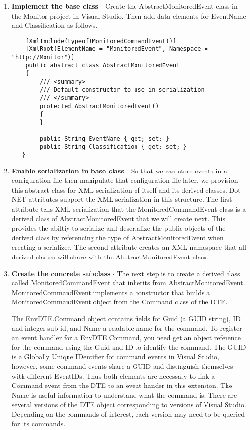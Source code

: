 \begin{enumerate}
\item {\bf Implement the base class} - 
Create the AbstractMonitoredEvent class in the Monitor project in Visual Studio.  Then add data elements for EventName and Classification as follows.

\begin{lstlisting}
    [XmlInclude(typeof(MonitoredCommandEvent))]
    [XmlRoot(ElementName = "MonitoredEvent", Namespace = "http://Monitor")]
    public abstract class AbstractMonitoredEvent
    {
        /// <summary>
        /// Default constructor to use in serialization
        /// </summary>
        protected AbstractMonitoredEvent()
        {
        }

        public String EventName { get; set; }
        public String Classification { get; set; }
   }
\end{lstlisting}

\item {\bf Enable serialization in base class} - 
So that we can store events in a configuration file then manipulate that configuration file later, we provision this abstract class for XML serialization of itself and its derived classes.  Dot NET attributes support the XML serialization in this structure.  The first attribute tells XML serialization that the MonitoredCommandEvent class is a derived class of AbstractMonitoredEvent that we will create next.  This provides the abiltiy to serialize and deserialize the public objects of the derived class by referencing the type of AbstractMonitoredEvent when creating a serializer.  The second attribute creates an XML namespace that all derived classes will share with the AbstractMonitoredEvent class.

\item {\bf Create the concrete subclass} - 
The next step is to create a derived class called MonitoredCommandEvent that inherits from AbstractMonitoredEvent.  MonitoredCommandEvent implements a constructor that builds a MonitoredCommandEvent object from the Command class of the DTE.

The EnvDTE.Command object contains fields for Guid (a GUID string), ID and integer sub-id, and Name a readable name for the command.  To register an event handler for a EnvDTE.Command, you need get an object reference for the command using the Guid and ID to identify the command.  The GUID is  a Globally Unique IDentifier for command events in Visual Studio, however, some command events share a GUID and distinguish themselves with different EventIDs. Thus both elements are necessary to link a Command event from the DTE to an event hander in this extension.  The Name is useful information to understand what the command is.    There are several versions of the DTE object corresponding to versions of Visual Studio.  Depending on the commands of interest, each version may need to be queried for its commands.  


\end{enumerate}
